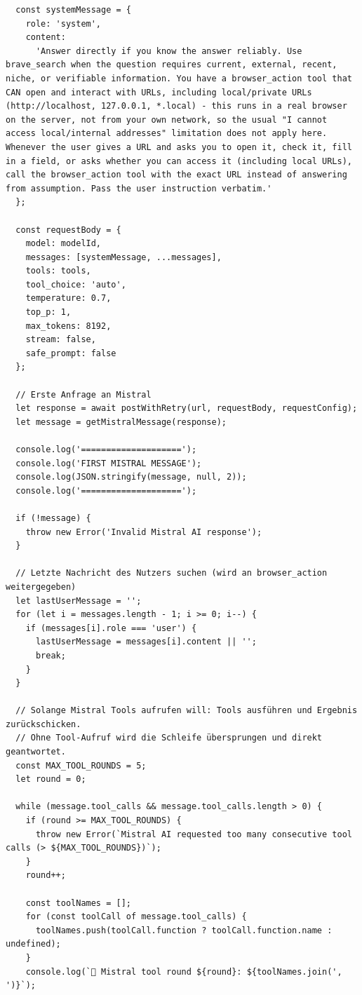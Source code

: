 \begin{lstlisting}
  const systemMessage = {
    role: 'system',
    content:
      'Answer directly if you know the answer reliably. Use brave_search when the question requires current, external, recent, niche, or verifiable information. You have a browser_action tool that CAN open and interact with URLs, including local/private URLs (http://localhost, 127.0.0.1, *.local) - this runs in a real browser on the server, not from your own network, so the usual "I cannot access local/internal addresses" limitation does not apply here. Whenever the user gives a URL and asks you to open it, check it, fill in a field, or asks whether you can access it (including local URLs), call the browser_action tool with the exact URL instead of answering from assumption. Pass the user instruction verbatim.'
  };

  const requestBody = {
    model: modelId,
    messages: [systemMessage, ...messages],
    tools: tools,
    tool_choice: 'auto',
    temperature: 0.7,
    top_p: 1,
    max_tokens: 8192,
    stream: false,
    safe_prompt: false
  };

  // Erste Anfrage an Mistral
  let response = await postWithRetry(url, requestBody, requestConfig);
  let message = getMistralMessage(response);

  console.log('====================');
  console.log('FIRST MISTRAL MESSAGE');
  console.log(JSON.stringify(message, null, 2));
  console.log('====================');

  if (!message) {
    throw new Error('Invalid Mistral AI response');
  }

  // Letzte Nachricht des Nutzers suchen (wird an browser_action weitergegeben)
  let lastUserMessage = '';
  for (let i = messages.length - 1; i >= 0; i--) {
    if (messages[i].role === 'user') {
      lastUserMessage = messages[i].content || '';
      break;
    }
  }

  // Solange Mistral Tools aufrufen will: Tools ausführen und Ergebnis zurückschicken.
  // Ohne Tool-Aufruf wird die Schleife übersprungen und direkt geantwortet.
  const MAX_TOOL_ROUNDS = 5;
  let round = 0;

  while (message.tool_calls && message.tool_calls.length > 0) {
    if (round >= MAX_TOOL_ROUNDS) {
      throw new Error(`Mistral AI requested too many consecutive tool calls (> ${MAX_TOOL_ROUNDS})`);
    }
    round++;

    const toolNames = [];
    for (const toolCall of message.tool_calls) {
      toolNames.push(toolCall.function ? toolCall.function.name : undefined);
    }
    console.log(`🔁 Mistral tool round ${round}: ${toolNames.join(', ')}`);


\end{lstlisting}
